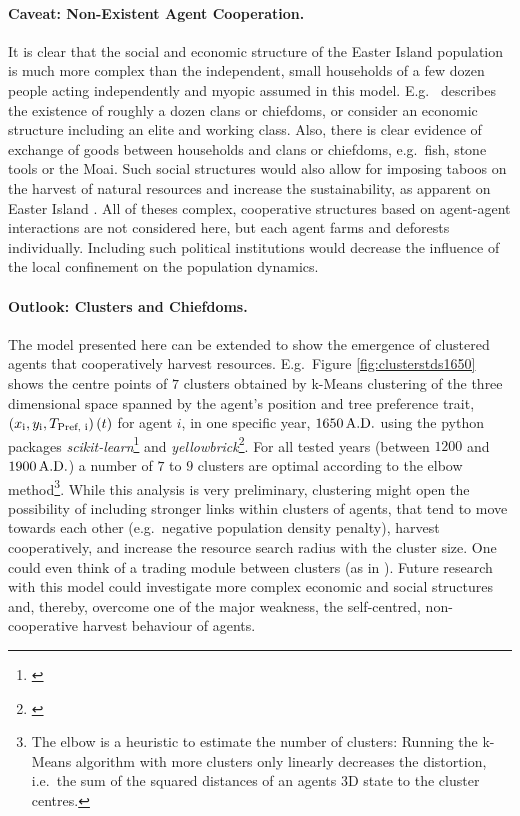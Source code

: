 \paragraph{Caveat: Non-Existent Agent Cooperation.}
It is clear that the social and economic structure of the Easter Island population is much more complex than the independent, small households of a few dozen people acting independently and myopic assumed in this model. 
E.g.\ \citet{Diamond2011} describes the existence of roughly a dozen clans or chiefdoms, or \citet{Puleston2017} consider an economic structure including an elite and working class.
Also, there is clear evidence of exchange of goods between households and clans or chiefdoms, e.g.\ fish, stone tools or the Moai.
Such social structures would also allow for imposing taboos on the harvest of natural resources and increase the sustainability, as apparent on Easter Island \citep{Good2006}. 
All of theses complex, cooperative structures based on agent-agent interactions are not considered here, but each agent farms and deforests individually.
Including such political institutions would decrease the influence of the local confinement on the population dynamics.

\paragraph{Outlook: Clusters and Chiefdoms.}
The model presented here can be extended to show the emergence of clustered agents that cooperatively harvest resources.
E.g.\ Figure \ref{fig:clusterstds1650} shows the centre points of $7$ clusters obtained by k-Means clustering of the three dimensional space spanned by the agent's position and tree preference trait, $\left( x_{\rm i}, y_{\rm i}, T_\text{Pref, i} \right)(t)$ for agent $i$, in one specific year, $1650\, {\rm A.D.}$ using the python packages \textit{scikit-learn}\footnote{\citet{scikit-learn}} and \textit{yellowbrick}\footnote{\citet{yellowbrick}}.
For all tested years (between $1200$ and $1900\, {\rm A.D.}$) a number of $7$ to $9$ clusters are optimal according to the elbow method\footnote{The elbow is a heuristic to estimate the number of clusters:
	Running the k-Means algorithm with more clusters only linearly decreases the distortion, i.e.\ the sum of the squared distances of an agents 3D state to the cluster centres.}.
While this analysis is very preliminary, clustering might open the possibility of including stronger links within clusters of agents, that tend to move towards each other (e.g.\ negative population density penalty), harvest cooperatively, and increase the resource search radius with the cluster size.
One could even think of a trading module between clusters (as in ).
Future research with this model could investigate more complex economic and social structures and, thereby, overcome one of the major weakness, the self-centred, non-cooperative harvest behaviour of agents.

